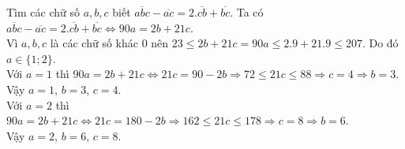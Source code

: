 \begin{ex}%
	Tìm các chữ số $a, b, c$ biết $\overline{abc}-\overline{ac}=2.\overline{cb}+\overline{bc}$.
	\loigiai
	{Ta có $\overline{abc} - \overline{ac}=2.\overline{cb}+ \overline{bc} \Leftrightarrow 90a=2b+21c$.\\
	Vì $a, b, c$ là các chữ số khác $0$ nên 
$23\le 2b+21c =  90a\le 2.9+21.9 \le 207$.
Do đó $a\in \{1; 2\}$.\\
		Với $a=1$ thì $90a = 2b + 21c\Leftrightarrow 21c= 90- 2b \Rightarrow 72 \le 21c \le 88 \Rightarrow c= 4 \Rightarrow b=3$. \\
		Vậy $a=1$, $b =3$, $c =4$.\\
		Với $a=2$ thì $90a = 2b + 21c\Leftrightarrow 21c= 180- 2b \Rightarrow 162 \le  21c \le  178 \Rightarrow  c= 8 \Rightarrow b=6$. \\Vậy $a=2$, $b=6$, $c=8$.
	}
\end{ex}
